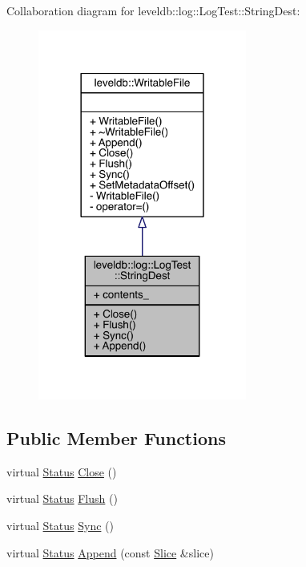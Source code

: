 Collaboration diagram for leveldb\+:\+:log\+:\+:Log\+Test\+:\+:String\+Dest\+:\nopagebreak
\begin{figure}[H]
\begin{center}
\leavevmode
\includegraphics[width=194pt]{classleveldb_1_1log_1_1_log_test_1_1_string_dest__coll__graph}
\end{center}
\end{figure}
\subsection*{Public Member Functions}
\begin{DoxyCompactItemize}
\item 
virtual \hyperlink{classleveldb_1_1_status}{Status} \hyperlink{classleveldb_1_1log_1_1_log_test_1_1_string_dest_a38df1bcf8935024e4f285a58659b2718}{Close} ()
\item 
virtual \hyperlink{classleveldb_1_1_status}{Status} \hyperlink{classleveldb_1_1log_1_1_log_test_1_1_string_dest_a697cde4f8abd492d7a00fc44254af051}{Flush} ()
\item 
virtual \hyperlink{classleveldb_1_1_status}{Status} \hyperlink{classleveldb_1_1log_1_1_log_test_1_1_string_dest_a62d1a49e6d80f723dc28e8dca944b39a}{Sync} ()
\item 
virtual \hyperlink{classleveldb_1_1_status}{Status} \hyperlink{classleveldb_1_1log_1_1_log_test_1_1_string_dest_a9760e8138f167b8b367232998cb53606}{Append} (const \hyperlink{classleveldb_1_1_slice}{Slice} \&slice)
\end{DoxyCompactItemize}
